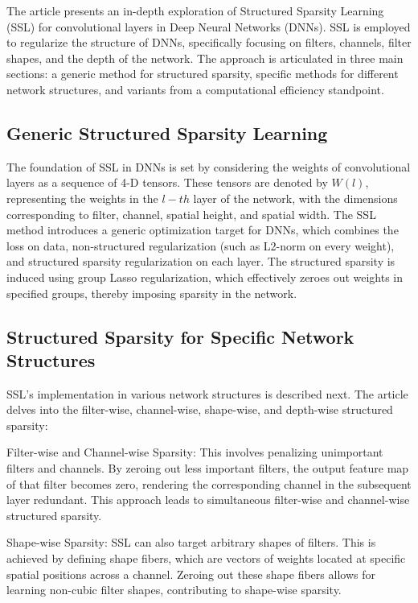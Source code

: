 The article presents an in-depth exploration of Structured Sparsity Learning (SSL) for convolutional layers in Deep Neural Networks (DNNs). SSL is employed to regularize the structure of DNNs, specifically focusing on filters, channels, filter shapes, and the depth of the network. The approach is articulated in three main sections: a generic method for structured sparsity, specific methods for different network structures, and variants from a computational efficiency standpoint.

\subsection{Generic Structured Sparsity Learning}

The foundation of SSL in DNNs is set by considering the weights of convolutional layers as a sequence of 4-D tensors. These tensors are denoted by $W(l)$, representing the weights in the $l-th$ layer of the network, with the dimensions corresponding to filter, channel, spatial height, and spatial width. The SSL method introduces a generic optimization target for DNNs, which combines the loss on data, non-structured regularization (such as L2-norm on every weight), and structured sparsity regularization on each layer. The structured sparsity is induced using group Lasso regularization, which effectively zeroes out weights in specified groups, thereby imposing sparsity in the network.

\subsection{Structured Sparsity for Specific Network Structures}

SSL's implementation in various network structures is described next. The article delves into the filter-wise, channel-wise, shape-wise, and depth-wise structured sparsity:

Filter-wise and Channel-wise Sparsity: This involves penalizing unimportant filters and channels. By zeroing out less important filters, the output feature map of that filter becomes zero, rendering the corresponding channel in the subsequent layer redundant. This approach leads to simultaneous filter-wise and channel-wise structured sparsity.

Shape-wise Sparsity: SSL can also target arbitrary shapes of filters. This is achieved by defining shape fibers, which are vectors of weights located at specific spatial positions across a channel. Zeroing out these shape fibers allows for learning non-cubic filter shapes, contributing to shape-wise sparsity.

